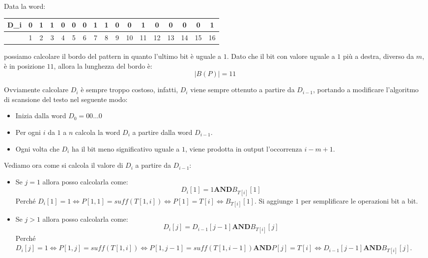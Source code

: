 \begin{esempio}
    Data la word:
    \begin{table}[!ht]
        \centering
        \begin{tabular}{|c|c|c|c|c|c|c|c|c|c|c|c|c|c|c|c|c|}
            D\_i & 0 & 1 & 1 & 0 & 0 & 0 & 1 & 1 & 0 & 0  & 1  & 0  & 0  & 0  & 0  & 1  \\ \hline
            ~    & 1 & 2 & 3 & 4 & 5 & 6 & 7 & 8 & 9 & 10 & 11 & 12 & 13 & 14 & 15 & 16 \\
        \end{tabular}
    \end{table}
    possiamo calcolare il bordo del pattern in quanto l'ultimo bit è uguale a $1$.
    Dato che il bit con valore uguale a $1$ più a destra, diverso da $m$, è in
    posizione $11$, allora la lunghezza del bordo è:
    \begin{equation}
        |B(P)| = 11
    \end{equation}
\end{esempio}
Ovviamente calcolare $D_i$ è sempre troppo costoso, infatti, $D_i$ viene sempre
ottenuto a partire da $D_{i - 1}$, portando a modificare l'algoritmo di scansione
del testo nel seguente modo:
\begin{itemize}
    \item Inizia dalla word $D_0 = 00\dots0$
    \item Per ogni $i$ da $1$ a $n$ calcola la word $D_i$ a partire dalla word
          $D_{i - 1}$.
    \item Ogni volta che $D_i$ ha il bit meno significativo uguale a $1$, viene
          prodotta in output l'occorrenza $i - m + 1$.
\end{itemize}
Vediamo ora come si calcola il valore di $D_i$ a partire da $D_{i - 1}$:
\begin{itemize}
    \item Se $j =  1$ allora posso calcolarla come:
          \begin{equation}
              D_i[1] = 1 \textbf{AND} B_{T[i]}[1]
          \end{equation}
          Perché $D_i[1] = 1 \iff P[1,1] = suff(T[1,i]) \iff P[1] = T[i] \iff
              B_{T[i]}[1]$. Si aggiunge $1$ per semplificare le operazioni bit
          a bit.
    \item Se $j > 1$ allora posso calcolarla come:
          \begin{equation}
              D_i[j] = D_{i - 1}[j - 1] \textbf{AND} B_{T[i]}[j]
          \end{equation}
          Perché $D_i[j] = 1 \iff P[1,j] = suff(T[1,i]) \iff P[1,j - 1] =
              suff(T[1,i - 1]) \textbf{AND} P[j] = T[i] \iff D_{i - 1}[j - 1]
              \textbf{AND} B_{T[i]}[j]$.
\end{itemize}
